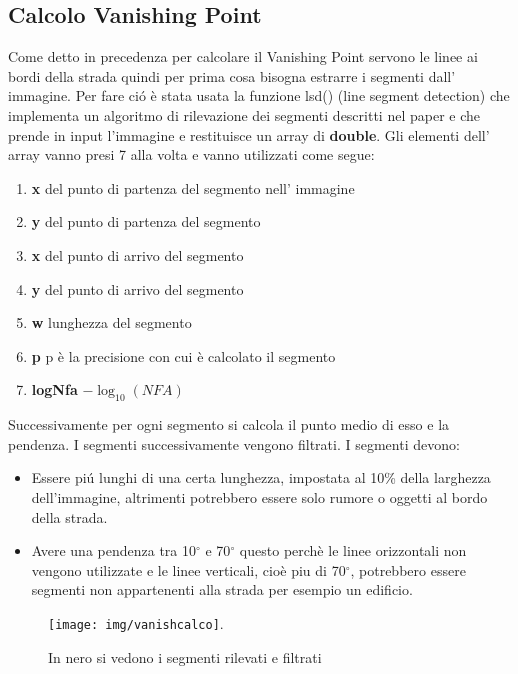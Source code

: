 	\subsection{Calcolo Vanishing Point}
		Come detto in precedenza per calcolare il Vanishing Point servono le linee ai bordi della strada quindi per prima cosa bisogna estrarre i segmenti dall' immagine. Per fare ci\'o è stata usata la funzione lsd() (line segment detection) che implementa un algoritmo di rilevazione dei segmenti descritti nel paper \cite{lsd} e che prende in input l'immagine e restituisce un array di \textbf{double}.
		Gli elementi dell' array vanno presi 7 alla volta e vanno utilizzati come segue:
		\begin{enumerate}
			\item \textbf{x} del punto di partenza del segmento nell' immagine
			\item \textbf{y} del punto di partenza del segmento
			\item \textbf{x} del punto di arrivo del segmento
			\item \textbf{y} del punto di arrivo del segmento
			\item \textbf{w} lunghezza del segmento
			\item \textbf{p} p è la precisione con cui è calcolato il segmento
			\item \textbf{logNfa} $ - \log_{10}(NFA)$
		\end{enumerate}
		Successivamente per ogni segmento si calcola il punto medio di esso e la pendenza. I segmenti successivamente vengono filtrati.
		I segmenti devono:
		\begin{itemize}
			\item Essere pi\'u lunghi di una certa lunghezza, impostata al 10\% della larghezza dell'immagine, altrimenti potrebbero essere solo rumore o oggetti al bordo della strada.
			\item Avere una pendenza tra 10$^{\circ}$ e 70$^{\circ}$ questo perchè le linee orizzontali non vengono utilizzate e le linee verticali, cioè piu di 70$^{\circ}$, potrebbero essere segmenti non appartenenti alla strada per esempio un edificio.
		\end{itemize}
		\begin{figure}[!ht]
			\centering
			\texttt{[image: img/vanishcalco]}.
			\caption[Segmenti rilevati]{In nero si vedono i segmenti rilevati e filtrati}
		\end{figure}

